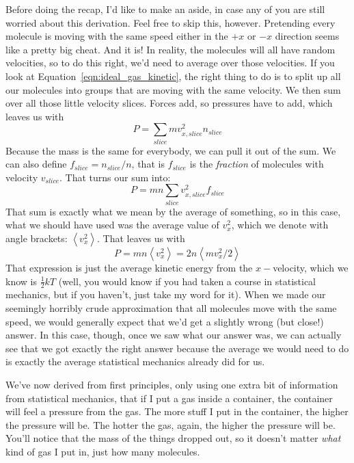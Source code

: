 \documentclass[letterpaper,11pt,preprint]{aastex}
\begin{document}
Before doing the recap, I'd like to make an aside, in case any of you
are still worried about this derivation.  Feel free to skip this,
however.  Pretending every molecule is
moving with the same speed either in the $+x$ or $-x$ direction seems
like a pretty big cheat.  And it is!  In reality, the molecules will
all have random velocities, so to do this right, we'd need to average
over those velocities.  If you look at
Equation~\ref{eqn:ideal_gas_kinetic}, the right thing to do is to
split up all our molecules into groups that are moving with the same
velocity.  We then sum over all those little velocity slices.  Forces
add, so pressures have to add, which leaves us with
$$P=\sum_{slice} m v_{x,slice}^2n_{slice}$$
Because the mass is the same for everybody, we can pull it out of the
sum.  We can also define $f_{slice}=n_{slice}/n$, that is $f_{slice}$
is the \textit{fraction} of molecules with velocity $v_{slice}$.  That
turns our sum into:
\begin{equation}
  P=mn\sum_{slice}v_{x,slice}^2f_{slice}
\end{equation}
That sum is exactly what we mean by the average of something, so in
this case, what we should have used was the average value of $v_x^2$,
which we denote with angle brackets: $\left < v_x^2\right >$. That
leaves us with
\begin{equation}
  P=mn\left <v_x^2 \right > = 2n \left <m v_x^2/2 \right >
\end{equation}
That expression is just the average kinetic energy from the
$x-$velocity, which we know is $\frac{1}{2}kT$ (well, you would know
if you had taken a course in statistical mechanics, but if you
haven't, just take my word for it).  When we made our seemingly
horribly crude approximation that all molecules move with the same
speed, we would generally expect that we'd get a slightly wrong (but
close!) answer.  In this case, though, once we saw what our answer
was, we can actually see that we got exactly the right answer because
the average we would need to do is exactly the average statistical
mechanics already did for us.

We've now derived from first principles, only using one extra bit of
information from statistical mechanics, that if I put a gas inside a
container, the container will feel a pressure from the gas.  The more
stuff I put in the container, the higher the pressure will be.  The
hotter the gas, again, the higher the pressure will be.  You'll notice
that the mass of the things dropped out, so it doesn't matter
\textit{what} kind of gas I put in, just how many molecules.
\end{document}
